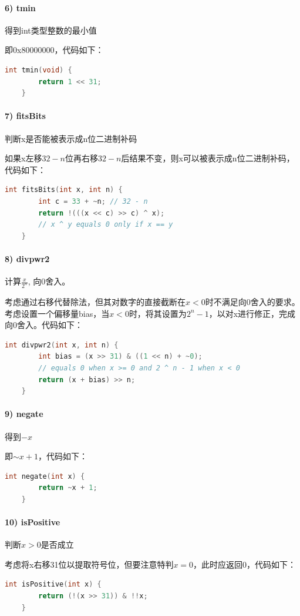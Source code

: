 \documentclass{article}
\begin{document}
    \paragraph{6) tmin} 得到int类型整数的最小值

    即0x80000000，代码如下：
    \begin{lstlisting}[language=C]
    int tmin(void) {
        return 1 << 31;
    }
\end{lstlisting}
    \paragraph{7) fitsBits} 判断x是否能被表示成n位二进制补码

    如果x左移$32-n$位再右移$32-n$后结果不变，则x可以被表示成n位二进制补码，代码如下：
    \begin{lstlisting}[language=C]
    int fitsBits(int x, int n) {
        int c = 33 + ~n; // 32 - n
        return !(((x << c) >> c) ^ x); 
        // x ^ y equals 0 only if x == y 
    }
\end{lstlisting}
    \paragraph{8) divpwr2} 计算$\frac{x}{2^n}$, 向0舍入。

    考虑通过右移代替除法，但其对数字的直接截断在$x<0$时不满足向0舍入的要求。考虑设置一个偏移量bias，当$x<0$时，将其设置为$2^n-1$，以对x进行修正，完成向0舍入。代码如下：
    \begin{lstlisting}[language=C]
    int divpwr2(int x, int n) {
        int bias = (x >> 31) & ((1 << n) + ~0); 
        // equals 0 when x >= 0 and 2 ^ n - 1 when x < 0
        return (x + bias) >> n;
    }
\end{lstlisting}
    \paragraph{9) negate} 得到$-x$

    即$\sim x + 1$，代码如下：
    \begin{lstlisting}[language=C]
    int negate(int x) {
        return ~x + 1;
    }
\end{lstlisting}
    \paragraph{10) isPositive} 判断$x>0$是否成立

    考虑将x右移31位以提取符号位，但要注意特判$x=0$，此时应返回0，代码如下：
    \begin{lstlisting}[language=C]
    int isPositive(int x) {
        return (!(x >> 31)) & !!x;
    }
\end{lstlisting}
\end{document}
